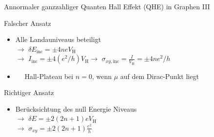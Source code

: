 \documentclass[../defence.tex]{subfiles}
\begin{document}
  \begin{frame}{Annormaler ganzzahliger Quanten Hall Effekt (QHE) in Graphen III}
        \begin{alertblock}{Falscher Ansatz}
          \begin{itemize}
            \item Alle Landauniveaus beteiligt\\
            \pause
            $\rightarrow$ $\delta E_\mathrm{inc}=\pm 4neV_\mathrm{H}$\\
            $\rightarrow$ $I_\mathrm{inc}=\pm 4(e^2/h)V_\mathrm{H}$\pause $\rightarrow$ $\sigma_ {xy,\mathrm{inc}}=\frac{I}{V_\mathrm{H}}=\pm 4ne^2 / h$
            \pause
            \item \faBolt$\quad$ Hall-Plateau bei $n=0$, wenn $\mu$ auf dem Dirac-Punkt liegt
          \end{itemize}
        \end{alertblock}
        \pause
        \begin{exampleblock}{Richtiger Ansatz}
          \begin{itemize}
            \item Berücksichtung des null Energie Niveaus\\
            \pause
            $\rightarrow$ $\delta E=\pm 2(2n+1)eV_\mathrm{H}$\\
            $\rightarrow$ $\sigma_{xy}=\pm 2(2n+1)\frac{e^2}{h}$
          \end{itemize}
        \end{exampleblock}
  \end{frame}
\end{document}

